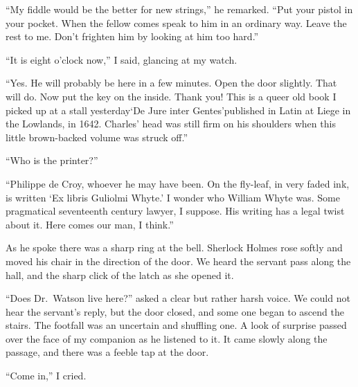 \documentclass[12pt,english]{book}
\begin{document}
{}``My fiddle would be the better for new strings,'' he remarked.
{}``Put your pistol in your pocket. When the fellow comes speak to
him in an ordinary way. Leave the rest to me. Don't frighten him by
looking at him too hard.''

{}``It is eight o'clock now,'' I said, glancing at my watch.

{}``Yes. He will probably be here in a few minutes. Open the door
slightly. That will do. Now put the key on the inside. Thank you!
This is a queer old book I picked up at a stall yesterday\mdsh{---}`De
Jure inter Gentes'\mdsh{---}published in Latin at Liege in the Lowlands,
in 1642. Charles' head was still firm on his shoulders when this little
brown-backed volume was struck off.''

{}``Who is the printer?''

{}``Philippe de Croy, whoever he may have been. On the fly-leaf,
in very faded ink, is written `Ex libris Guliolmi Whyte.' I wonder
who William Whyte was. Some pragmatical seventeenth century lawyer,
I suppose. His writing has a legal twist about it. Here comes our
man, I think.''

As he spoke there was a sharp ring at the bell. Sherlock Holmes rose
softly and moved his chair in the direction of the door. We heard
the servant pass along the hall, and the sharp click of the latch
as she opened it.

{}``Does Dr.\ Watson live here?'' asked a clear but rather harsh
voice. We could not hear the servant's reply, but the door closed,
and some one began to ascend the stairs. The footfall was an uncertain
and shuffling one. A look of surprise passed over the face of my companion
as he listened to it. It came slowly along the passage, and there
was a feeble tap at the door.

{}``Come in,'' I cried.
\end{document}
